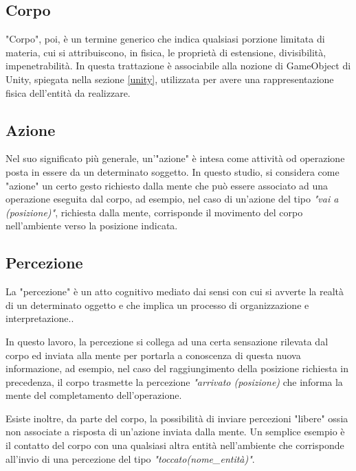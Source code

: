 \subsection{Corpo}

"Corpo", poi, è un termine generico che indica qualsiasi porzione limitata di materia, cui si attribuiscono, in fisica, le proprietà di estensione, divisibilità, impenetrabilità.\cite{treccani}
In questa trattazione è associabile alla nozione di GameObject di Unity, spiegata nella sezione \ref{unity}, utilizzata per avere una rappresentazione fisica dell'entità da realizzare.

\subsection{Azione}

Nel suo significato più generale, un'"azione" è intesa come attività od operazione posta in essere da un determinato soggetto.\cite{treccani}
In questo studio, si considera come "azione" un certo gesto richiesto dalla mente che può essere associato ad una operazione eseguita dal corpo, ad esempio, nel
caso di un'azione del tipo \textit{"vai a (posizione)"}, richiesta dalla mente, corrisponde il movimento del corpo nell'ambiente verso la posizione indicata.

\subsection{Percezione}

La "percezione" è un atto cognitivo mediato dai sensi con cui si avverte la realtà di un determinato oggetto e che implica un processo di organizzazione e interpretazione.\cite{treccani}.

\medskip

In questo lavoro, la percezione si collega ad una certa sensazione rilevata dal corpo ed inviata alla mente per portarla a conoscenza di questa nuova informazione, ad esempio, nel caso del raggiungimento della posizione richiesta in precedenza, il corpo trasmette la percezione \textit{"arrivato (posizione)} che informa la mente del completamento dell'operazione.

\medskip

Esiste inoltre, da parte del corpo, la possibilità di inviare percezioni "libere" ossia non associate a risposta di un'azione inviata dalla mente. Un semplice esempio è il contatto del corpo con una qualsiasi altra entità nell'ambiente che corrisponde all'invio di una percezione del tipo \textit{"toccato(nome\_entità)"}.


